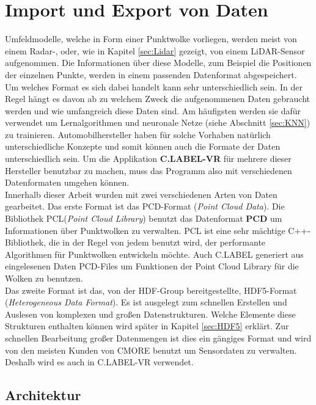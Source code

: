 \section{Import und Export von Daten}
\label{sec:ImportExport}
Umfeldmodelle, welche in Form einer Punktwolke vorliegen, werden meist von einem Radar-, oder, wie in Kapitel \ref{sec:Lidar} gezeigt, von einem LiDAR-Sensor aufgenommen. Die Informationen über diese Modelle, zum Beispiel die Positionen der einzelnen Punkte, werden in einem passenden Datenformat abgespeichert. Um welches Format es sich dabei handelt kann sehr unterschiedlich sein. In der Regel hängt es davon ab zu welchem Zweck die aufgenommenen Daten gebraucht werden und wie umfangreich diese Daten sind. Am häufigsten werden sie dafür verwendet um Lernalgorithmen und neuronale Netze (siehe Abschnitt \ref{sec:KNN}) zu trainieren. Automobilhersteller haben für solche Vorhaben natürlich unterschiedliche Konzepte und somit können auch die Formate der Daten unterschiedlich sein. Um die Applikation \textbf{C.LABEL-VR} für mehrere dieser Hersteller benutzbar zu machen, muss das Programm also mit verschiedenen Datenformaten umgehen können.\\ 

Innerhalb dieser Arbeit wurden mit zwei verschiedenen Arten von Daten gearbeitet. Das erste Format ist das PCD-Format (\textit{Point Cloud Data}). Die Bibliothek PCL(\textit{Point Cloud Library}) benutzt das Datenformat \textbf{PCD} um Informationen über Punktwolken zu verwalten. PCL ist eine sehr mächtige C++-Bibliothek, die in der Regel von jedem benutzt wird, der performante Algorithmen für Punktwolken entwickeln möchte. Auch C.LABEL generiert aus eingelesenen Daten PCD-Files um Funktionen der Point Cloud Library für die Wolken zu benutzen.\\

Das zweite Format ist das, von der HDF-Group bereitgestellte, HDF5-Format (\textit{Heterogeneous Data Format}). Es ist ausgelegt zum schnellen Erstellen und Auslesen von komplexen und großen Datenstrukturen. Welche Elemente diese Strukturen enthalten können wird später in Kapitel \ref{sec:HDF5} erklärt. Zur schnellen Bearbeitung großer Datenmengen ist dies ein gängiges Format und wird von den meisten Kunden von CMORE benutzt um Sensordaten zu verwalten. Deshalb wird es auch in C.LABEL-VR verwendet.\\

\subsection{Architektur}

